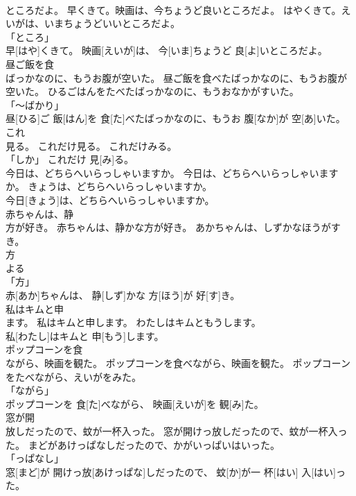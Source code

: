 \documentclass[8pt]{extreport}
\begin{document}
\begin{CJK}{UTF8}{min}
\\	ところだよ。	早くきて。映画は、今ちょうど良いところだよ。	はやくきて。えいがは、いまちょうどいいところだよ。	
\\	「ところ」 
\\	早[はや]くきて。 映画[えいが]は、 今[いま]ちょうど 良[よ]いところだよ。		
\\	昼ご飯を食
\\	ばっかなのに、もうお腹が空いた。	昼ご飯を食べたばっかなのに、もうお腹が空いた。	ひるごはんをたべたばっかなのに、もうおなかがすいた。	
\\	「～ばかり」 
\\	昼[ひる]ご 飯[はん]を 食[た]べたばっかなのに、もうお 腹[なか]が 空[あ]いた。		
\\	これ
\\	見る。	これだけ見る。	これだけみる。	
\\	「しか」	これだけ 見[み]る。		
\\	今日は、どちらへいらっしゃいますか。	今日は、どちらへいらっしゃいますか。	きょうは、どちらへいらっしゃいますか。	
\\	今日[きょう]は、どちらへいらっしゃいますか。		
\\	赤ちゃんは、静
\\	方が好き。	赤ちゃんは、静かな方が好き。	あかちゃんは、しずかなほうがすき。	
\\	方 
\\	よる 
\\	「方」 
\\	赤[あか]ちゃんは、 静[しず]かな 方[ほう]が 好[す]き。		
\\	私はキムと申
\\	ます。	私はキムと申します。	わたしはキムともうします。	
\\	私[わたし]はキムと 申[もう]します。		
\\	ポップコーンを食
\\	ながら、映画を観た。	ポップコーンを食べながら、映画を観た。	ポップコーンをたべながら、えいがをみた。	
\\	「ながら」 
\\	ポップコーンを 食[た]べながら、 映画[えいが]を 観[み]た。		
\\	窓が開
\\	放しだったので、蚊が一杯入った。	窓が開けっ放しだったので、蚊が一杯入った。	まどがあけっぱなしだったので、かがいっぱいはいった。	
\\	「っぱなし」 
\\	窓[まど]が 開けっ放[あけっぱな]しだったので、 蚊[か]が一 杯[はい] 入[はい]った。		

\end{CJK}
\end{document}
